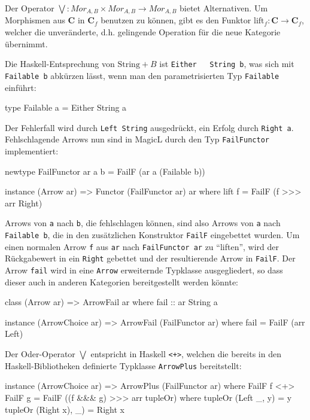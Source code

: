 \documentclass[a4paper, bibgerm]{book}
\newcommand\icode[1]{\lstinline?#1?}
\newcommand\ato{\rightarrow} %
\begin{document}
Der Operator $\bigvee : Mor_{A,B} \times Mor_{A,B}
\rightarrow Mor_{A,B} $ bietet Alternativen. Um Morphismen aus
$\mathbf{C}$ in $\mathbf{C}_f$ benutzen zu können, gibt es den Funktor
$\mathrm{lift}_f:\mathbf{C} \ato \mathbf{C}_f$, welcher die
unveränderte, d.h. gelingende Operation für die neue Kategorie
übernimmt.

Die Haskell-Entsprechung von $\mathrm{String}+B$ ist \icode{Either
  String b}, was sich mit \icode{Failable b} abkürzen lässt, wenn man
den parametrisierten Typ \icode{Failable} einführt:

\begin{code}
type Failable a = Either String a
\end{code}

Der Fehlerfall wird durch \icode{Left String} ausgedrückt, ein Erfolg
durch \icode{Right a}. Fehlschlagende Arrows nun sind in MagicL durch den
Typ \icode{FailFunctor} implementiert:

\begin{code}
newtype FailFunctor ar a b = FailF (ar a (Failable b))

instance (Arrow ar) => Functor (FailFunctor ar) ar where
    lift f = FailF (f >>> arr Right)
\end{code} %

Arrows von \icode{a} nach \icode{b}, die fehlschlagen können, sind also
Arrows von \icode{a} nach \icode{Failable b}, die in den zusätzlichen
Konstruktor \icode{FailF} eingebettet wurden. Um einen normalen Arrow
\icode{f} aus \icode{ar} nach \icode{FailFunctor ar} zu "`liften"', wird
der Rückgabewert in ein \icode{Right} gebettet und der resultierende
Arrow in \icode{FailF}.
Der Arrow \icode{fail} wird in eine \icode{Arrow} erweiternde Typklasse
ausgegliedert, so dass dieser auch in anderen Kategorien bereitgestellt
werden könnte:

\begin{code}
class (Arrow ar) => ArrowFail ar where
  fail :: ar String a

instance (ArrowChoice ar) => ArrowFail (FailFunctor ar) where
  fail = FailF (arr Left)
\end{code}

Der Oder-Operator $\bigvee$ entspricht in Haskell \icode{<+>}, welchen
die bereits in den Haskell-Bibliotheken definierte Typklasse
\icode{ArrowPlus} bereitstellt:

\begin{code}
instance (ArrowChoice ar) => ArrowPlus (FailFunctor ar) where
  FailF f <+> FailF g = FailF ((f &&& g) >>> arr tupleOr)
    where tupleOr (Left  _, y)  = y
          tupleOr (Right x), _) = Right x
\end{code} %
\end{document}

